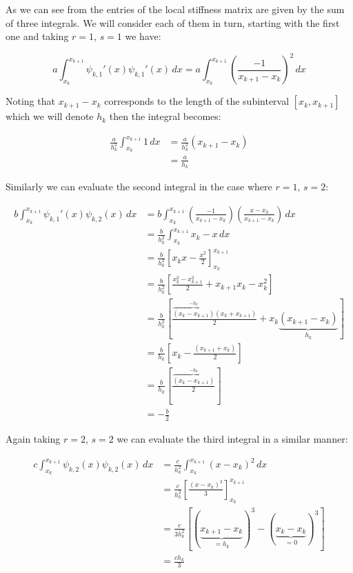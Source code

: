 As we can see from  the entries of the local stiffness matrix are
given by the sum of three integrals. We will consider each of them in turn, starting with the first one and taking
$r = 1$, $s = 1$ we have:

\begin{equation*}
       a\int_{x_k}^{x_{k+1}}\psi_{k,1}'(x)\psi_{k,1}'(x)\, dx =
         a\int_{x_k}^{x_{k+1}}\left(\frac{-1}{x_{k+1} - x_k}\right)^2\, dx
\end{equation*}

Noting that $x_{k+1} - x_k$ corresponds to the length of the subinterval $[x_k, x_{k+1}]$ which we will
denote $h_k$ then the integral becomes:

\begin{align*}
	\frac{a}{h_k^2}\int_{x_k}^{x_{k+1}}1\, dx &= \frac{a}{h_k^2}(x_{k+1} - x_k) \\
          &= \frac{a}{h_k}
\end{align*}

Similarly we can evaluate the second integral in the case where $r=1$, $s=2$:

\begin{align*}
	b\int_{x_k}^{x_{k+1}}\psi_{k,1}'(x)\psi_{k,2}(x)\, dx 
      &=  b\int_{x_k}^{x_{k+1}}\left(\frac{-1}{x_{k+1} - x_k}\right)
                               \left(\frac{x - x_k}{x_{k+1} - x_k}\right)\, dx \\
      &= \frac{b}{h_k^2}\int_{x_k}^{x_{k+1}}x_k - x\, dx \\
      &= \frac{b}{h_k^2}\left[x_kx - \frac{x^2}{2}\right]_{x_k}^{x_{k+1}} \\
      &= \frac{b}{h_k^2}\left[ \frac{x_k^2 - x_{k+1}^2}{2} + x_{k+1}x_k - x_k^2 \right] \\
      &= \frac{b}{h_k^2}\left[ \frac{\overbrace{(x_k - x_{k+1})}^{-h_k}(x_k + x_{k+1})}{2}
              + x_k\underbrace{(x_{k+1} - x_k)}_{h_k}\right] \\
      &= \frac{b}{h_k}\left[ x_k - \frac{(x_{k+1} + x_k)}{2} \right] \\
      &= \frac{b}{h_k}\left[\frac{\overbrace{(x_k - x_{k+1})}^{-h_k}}{2}\right] \\
      &= -\frac{b}{2}
\end{align*}

Again taking $r=2$, $s=2$ we can evaluate the third integral in a similar manner:

\begin{align*}
	c\int_{x_k}^{x_{k+1}}\psi_{k,2}(x)\psi_{k,2}(x)\, dx
       &= \frac{c}{h_k^2}\int_{x_k}^{x_{k + 1}}(x - x_k)^2\, dx \\
       &= \frac{c}{h_k^2}\left[ \frac{(x - x_k)^3}{3} \right]_{x_k}^{x_{k+1}} \\
       &= \frac{c}{3h_k^2}\left[ (\underbrace{x_{k+1} - x_k}_{= h_k})^3
                            -(\underbrace{x_k - x_k}_{=0})^3\right] \\
       &= \frac{ch_k}{3}
\end{align*}

